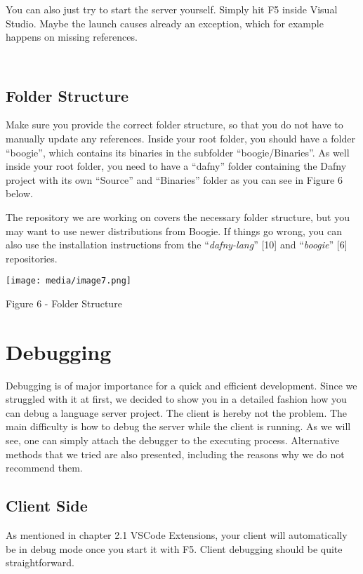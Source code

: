 \documentclass[]{book}
\begin{document}
You can also just try to start the server yourself. Simply hit F5 inside Visual Studio. Maybe the launch causes already an exception, which for example happens on missing references.

\section{\texorpdfstring{\\
Folder Structure}{ Folder Structure}}\label{folder-structure}

Make sure you provide the correct folder structure, so that you do not have to manually update any references. Inside your root folder, you should have a folder ``boogie'', which contains its binaries in the subfolder ``boogie/Binaries''. As well inside your root folder, you need to have a ``dafny'' folder containing the Dafny project with its own ``Source'' and ``Binaries'' folder as you can see in Figure 6 below.

The repository we are working on covers the necessary folder structure, but you may want to use newer distributions from Boogie. If things go wrong, you can also use the installation instructions from the ``\emph{dafny-lang}'' {[}10{]} and ``\emph{boogie}'' {[}6{]} repositories.

\texttt{[image: media/image7.png]}

\protect\hypertarget{_Ref26822087}{}{}Figure 6 - Folder Structure

\chapter{Debugging}\label{debugging}

Debugging is of major importance for a quick and efficient development. Since we struggled with it at first, we decided to show you in a detailed fashion how you can debug a language server project. The client is hereby not the problem. The main difficulty is how to debug the server while the client is running. As we will see, one can simply attach the debugger to the executing process. Alternative methods that we tried are also presented, including the reasons why we do not recommend them.

\section{Client Side}\label{client-side}

As mentioned in chapter 2.1 VSCode Extensions, your client will automatically be in debug mode once you start it with F5. Client debugging should be quite straightforward.
\end{document}
